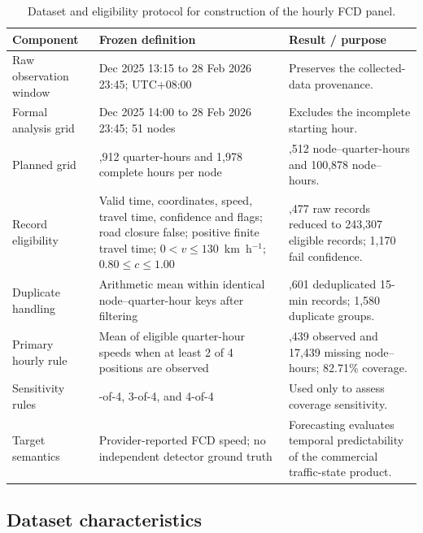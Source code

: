 \documentclass[pdflatex,sn-basic,Numbered]{sn-jnl}
\begin{document}
\begin{table}[!htbp]
\centering
\caption{Dataset and eligibility protocol for construction of the hourly FCD panel.}
\label{tab:data_eligibility_protocol}
\footnotesize
\begin{tabularx}{\textwidth}{|>{\raggedright\arraybackslash}p{}|>{\raggedright\arraybackslash}p{}|>{\raggedright\arraybackslash}X|}
\hline
\textbf{Component} & \textbf{Frozen definition} & \textbf{Result / purpose} \\
\hline
Raw observation window & 8 Dec 2025 13:15 to 28 Feb 2026 23:45; UTC+08:00 & Preserves the collected-data provenance. \\
\hline
Formal analysis grid & 8 Dec 2025 14:00 to 28 Feb 2026 23:45; 51 nodes & Excludes the incomplete starting hour. \\
\hline
Planned grid & 7,912 quarter-hours and 1,978 complete hours per node & 403,512 node--quarter-hours and 100,878 node--hours. \\
\hline
Record eligibility & Valid time, coordinates, speed, travel time, confidence and flags; road closure false; positive finite travel time; $0<v\leq130$~km~h$^{-1}$; $0.80\leq c\leq1.00$ & 244,477 raw records reduced to 243,307 eligible records; 1,170 fail confidence. \\
\hline
Duplicate handling & Arithmetic mean within identical node--quarter-hour keys after filtering & 241,601 deduplicated 15-min records; 1,580 duplicate groups. \\
\hline
Primary hourly rule & Mean of eligible quarter-hour speeds when at least 2 of 4 positions are observed & 83,439 observed and 17,439 missing node--hours; 82.71\% coverage. \\
\hline
Sensitivity rules & 1-of-4, 3-of-4, and 4-of-4 & Used only to assess coverage sensitivity. \\
\hline
Target semantics & Provider-reported FCD speed; no independent detector ground truth & Forecasting evaluates temporal predictability of the commercial traffic-state product. \\
\hline
\end{tabularx}
\end{table}

\subsection{Dataset characteristics}
\label{subsec:dataset-characteristics}
\end{document}
